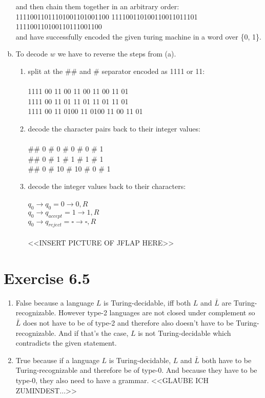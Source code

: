 \documentclass{article} %
\newcommand{\homeworkNumber}{6}
\begin{document}
\begin{enumerate}[(a)]
and then chain them together in an arbitrary order:\\
11110011011101001101001100 111100110100110011011101 111100110100110111001100\\
and have successfully encoded the given turing machine in a word over \{0, 1\}.

\clearpage

\item
To decode $w$ we have to reverse the steps from (a).

\begin{enumerate}[1.]
\item split at the $\#\#$ and $\#$ separator encoded as 1111 or 11:\\\\
1111 00 11 00 11 00 11 00 11 01 \\
1111 00 11 01 11 01 11 01 11 01 \\
1111 00 11 0100 11 0100 11 00 11 01 \\

\item decode the character pairs back to their integer values:\\\\
\#\# 0 \# 0 \# 0 \# 0 \# 1 \\
\#\# 0 \# 1 \# 1 \# 1 \# 1 \\
\#\# 0 \# 10 \# 10 \# 0 \# 1 \\

\item decode the integer values back to their characters:\\\\
$q_0 \to q_0 = 0 \to 0, R$\\
$q_0 \to q_{accept} = 1 \to 1, R$\\
$q_0 \to q_{reject} = \square \to \square, R$\\\\

<<INSERT PICTURE OF JFLAP HERE>>

\end{enumerate}
\end{enumerate}

\section*{Exercise \homeworkNumber.5}
\begin{enumerate}
\item False because a language $L$ is Turing-decidable, iff both $L$ and $\bar{L}$ are Turing-recognizable. However type-2 languages are not closed under complement so $\bar{L}$ does not have to be of type-2 and therefore also doesn't have to be Turing-recognizable. And if that's the case, $L$ is not Turing-decidable which contradicts the given statement.

\item True because if a language $L$ is Turing-decidable, $L$ and $\bar{L}$ both have to be Turing-recognizable and therefore be of type-0. And because they have to be type-0, they also need to have a grammar.
<<GLAUBE ICH ZUMINDEST...>>
\end{enumerate}
\end{document}
